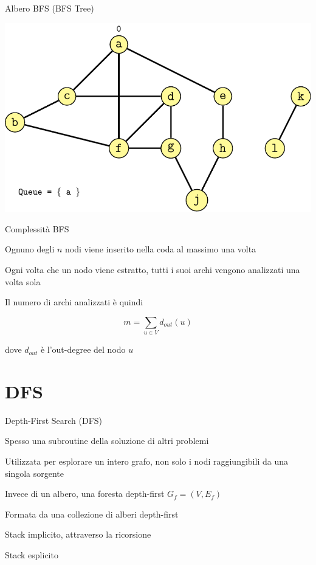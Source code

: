 \begin{frame}{Albero BFS (\alert{BFS Tree})}

\includegraphics[width=1.0\textwidth,page=12]{erd.pdf}

\end{frame}


\begin{frame}{Complessità BFS}

\BIL
\item Ognuno degli $n$ nodi viene inserito nella coda al massimo una volta 
\item Ogni volta che un nodo viene estratto, tutti i suoi archi vengono analizzati una volta
sola
\item Il numero di archi analizzati è quindi 

\[
  m = \sum_{u \in V} d_{\mathit{out}}(u) 
\]

dove $d_{\mathit{out}}$ è l'out-degree del nodo $u$
\EIL

\end{frame}

\section{DFS}


\begin{frame}{Depth-First Search (DFS)}

\BI
\item Spesso una subroutine della soluzione di altri problemi
\item Utilizzata per esplorare un intero grafo, non solo i nodi 
raggiungibili da una singola sorgente
\EI

\BI
\item Invece di un albero, una foresta depth-first $G_f = (V, E_f)$
\item Formata da una collezione di alberi depth-first
\EI

\BI
\item Stack implicito, attraverso la ricorsione
\item Stack esplicito
\EI

\end{frame}



